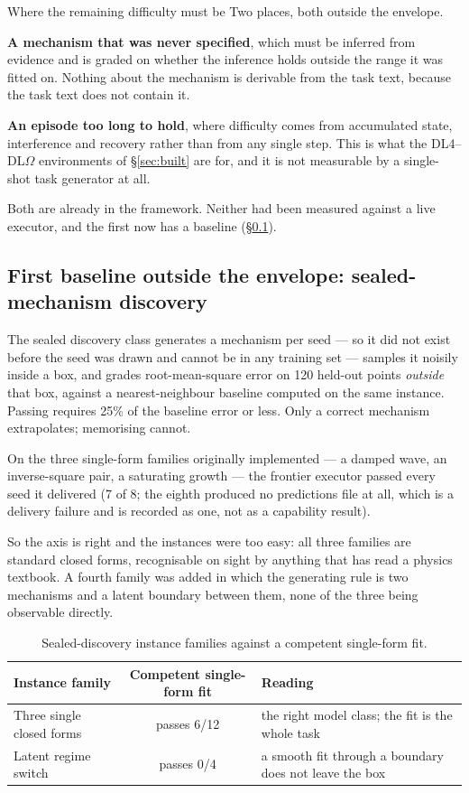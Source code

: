 \documentclass[11pt]{article}
\theoremstyle{definition}
\newcommand{\Om}{\ensuremath{\Omega}}
\begin{document}
\begin{cautionbox}{Where the remaining difficulty must be}
Two places, both outside the envelope.

\textbf{A mechanism that was never specified}, which must be inferred from evidence and is graded on whether the inference holds outside the range it was fitted on. Nothing about the mechanism is derivable from the task text, because the task text does not contain it.

\textbf{An episode too long to hold}, where difficulty comes from accumulated state, interference and recovery rather than from any single step. This is what the DL4--DL\Om{} environments of \S\ref{sec:built} are for, and it is not measurable by a single-shot task generator at all.

Both are already in the framework. Neither had been measured against a live executor, and the first now has a baseline (\S\ref{sec:discovery}).
\end{cautionbox}

\subsection{First baseline outside the envelope: sealed-mechanism discovery}\label{sec:discovery}

The sealed discovery class generates a mechanism per seed --- so it did not exist before the seed was drawn and cannot be in any training set --- samples it noisily inside a box, and grades root-mean-square error on 120 held-out points \emph{outside} that box, against a nearest-neighbour baseline computed on the same instance. Passing requires 25\% of the baseline error or less. Only a correct mechanism extrapolates; memorising cannot.

On the three single-form families originally implemented --- a damped wave, an inverse-square pair, a saturating growth --- the frontier executor passed every seed it delivered (7 of 8; the eighth produced no predictions file at all, which is a delivery failure and is recorded as one, not as a capability result).

So the axis is right and the instances were too easy: all three families are standard closed forms, recognisable on sight by anything that has read a physics textbook. A fourth family was added in which the generating rule is two mechanisms and a latent boundary between them, none of the three being observable directly.

\begin{table}[!htbp]
\centering\small
\begin{tabularx}{\textwidth}{@{}lcY@{}}
\toprule
Instance family & Competent single-form fit & Reading \\
\midrule
Three single closed forms & passes 6/12 & the right model class; the fit is the whole task \\
Latent regime switch & passes 0/4 & a smooth fit through a boundary does not leave the box \\
\bottomrule
\end{tabularx}
\caption{Sealed-discovery instance families against a competent single-form fit.}
\label{tab:sealedfamilies}
\end{table}
\end{document}
